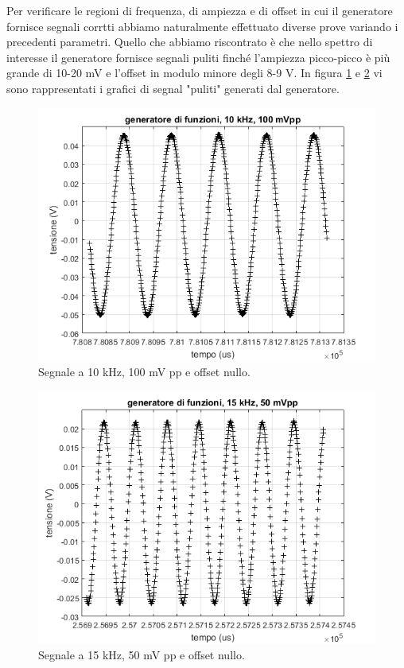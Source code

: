 \documentclass[journal, a4paper]{IEEEtran}
\begin{document}
Per verificare le regioni di frequenza, di ampiezza e di offset in cui il generatore fornisce segnali corrtti abbiamo naturalmente effettuato diverse prove variando i precedenti parametri.
Quello che abbiamo riscontrato è che nello spettro di interesse il generatore fornisce segnali puliti finché l'ampiezza picco-picco è più grande di 10-20 mV e l'offset in modulo minore degli 8-9 V. In figura \ref{fig:prova_gen_10khz_100mpp} e \ref{fig:prova_gen_15khz_50mpp} vi sono rappresentati i grafici di segnal "puliti" generati dal generatore.

\begin{figure}[htp]
\centering
\includegraphics[scale=.4]{prova_gen_10khz_100mpp}
\caption{Segnale a 10 kHz, 100 mV pp e offset nullo.}
\label{fig:prova_gen_10khz_100mpp}
\end{figure}

\begin{figure}[htp]
\centering
\includegraphics[scale=.4]{prova_gen_15khz_50mpp}
\caption{Segnale a 15 kHz, 50 mV pp e offset nullo.}
\label{fig:prova_gen_15khz_50mpp}
\end{figure}
\end{document}
